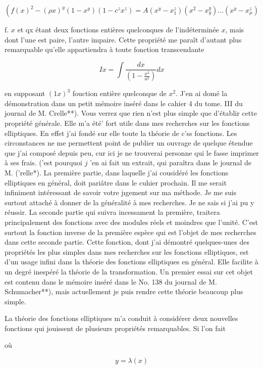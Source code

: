 \documentclass{article}
\begin{document}
\[
\left(f(x)^{2}-(\rho x)^{y}\left(1-x^{y}\right)\left(1-c^{z} x^{z}\right)=A\left(x^{y}-x_{1}^{z}\right)\left(x^{2}-x_{y}^{y}\right) \ldots\left(x^{y}-x_{\mu}^{z}\right)\right.
\]

f. \(x\) et qx étant deux fonctions entières quelconques de l'indéterminée \(x\), mais dont l'une est paire, l'autre impaire. Cette propriété me paraît d'autant plus remarquable qu'elle appartiendra à toute fonction transcendante

\[
I x=\int \frac{d x}{\left(1-\frac{x^{2}}{a^{2}}\right)} d x
\]

en supposant \((1 x)^{3}\) fouction entière quelconque de \(x^{2}\). J'en ai domé la démonstration dans un petit mémoire inséré dans le cahier 4 du tome. III du journal de M. Crelle**). Vous verrez que rien n'est plus simple que d'établir
cette propriété générale. Elle m'a été' fort utile dans mes recherches sur les fonctions elliptiques. En effet j'ai fondé sur elle toute la théorie de c'ss fonctions. Les circonstances ne me permettent point de publier un ouvrage de quelque étendue que j'ai composé depuis peu, cur ici je ne trouverai personne qui le fasse imprimer à ses frais. ('est pourquoi \(j\) 'en ai fait un extrait, qui paraîtra dans le journal de M. ('relle*). La première partie, dans laquelle j'ai cousidéré les fonctions elliptiques en général, doit pariâtre dans le cuhier prochain. Il me serait infiniment intéressant de savoir votre jıgement sur ma méthode. Je me suis surtout attaché à donner de la généralité à mes recherches. Je ne sais si j'ai pu y réussir. La seconde partie qui suivra incessament la première, traitera principalement des fonctions avec des modules réels et moindres que l'unité. C'est surtout la fonction inverse de la première espèce qui est l'objet de mes recherches dans cette seconde partie. Cette fonction, dont j'ai démontré quelques-unes des propriétés les plus simples dans mes recherches sur les fonctions elliptiques, est d'un usage infini dans la théorie des fonctions elliptiques en général. Elle facilite à un degré inespéré la théorie de la transformation. Un premier essai sur cet objet est contenu dans le mémoire inséré dans le No. 138 du journal de M. Schumacher**), mais actuellement je puis rendre cette théorie beaucoup plus simple.

La théorie des fonctions elliptiques m'a conduit à considérer deux nouvelles fonctions qui jouissent de plusieurs propriétés remarquables. Si l'on fait

où

\[
y=\lambda(x)
\]
\end{document}
